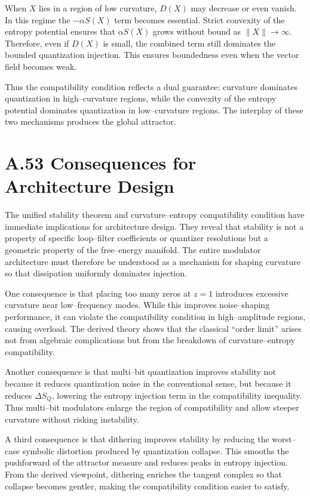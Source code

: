 When \(X\) lies in a region of low curvature, \(D(X)\) may decrease or even vanish. In this regime the \(-\alpha S(X)\) term becomes essential. Strict convexity of the entropy potential ensures that \(\alpha S(X)\) grows without bound as \(\|X\|\to\infty\). Therefore, even if \(D(X)\) is small, the combined term still dominates the bounded quantization injection. This ensures boundedness even when the vector field becomes weak.

Thus the compatibility condition reflects a dual guarantee: curvature dominates quantization in high–curvature regions, while the convexity of the entropy potential dominates quantization in low–curvature regions. The interplay of these two mechanisms produces the global attractor.

\section{A.53 Consequences for Architecture Design}

The unified stability theorem and curvature–entropy compatibility condition have immediate implications for architecture design. They reveal that stability is not a property of specific loop–filter coefficients or quantizer resolutions but a geometric property of the free–energy manifold. The entire modulator architecture must therefore be understood as a mechanism for shaping curvature so that dissipation uniformly dominates injection.

One consequence is that placing too many zeros at \(z=1\) introduces excessive curvature near low–frequency modes. While this improves noise–shaping performance, it can violate the compatibility condition in high–amplitude regions, causing overload. The derived theory shows that the classical “order limit” arises not from algebraic complications but from the breakdown of curvature–entropy compatibility.

Another consequence is that multi–bit quantization improves stability not because it reduces quantization noise in the conventional sense, but because it reduces \(\Delta S_Q\), lowering the entropy injection term in the compatibility inequality. Thus multi–bit modulators enlarge the region of compatibility and allow steeper curvature without risking instability.

A third consequence is that dithering improves stability by reducing the worst–case symbolic distortion produced by quantization collapse. This smooths the pushforward of the attractor measure and reduces peaks in entropy injection. From the derived viewpoint, dithering enriches the tangent complex so that collapse becomes gentler, making the compatibility condition easier to satisfy.


